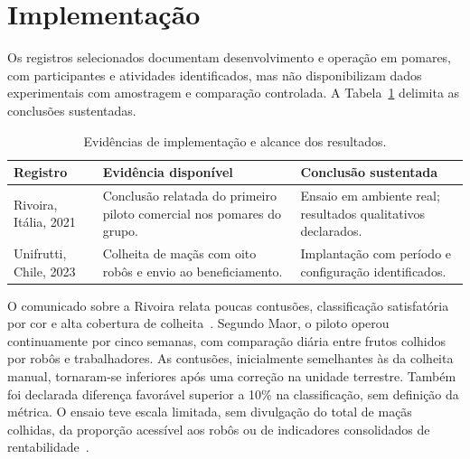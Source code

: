 \section{Implementação}

Os registros selecionados documentam desenvolvimento e operação em pomares, com participantes e atividades identificados, mas não disponibilizam dados experimentais com amostragem e comparação controlada. A Tabela~\ref{tab:evidencias_implementacao} delimita as conclusões sustentadas.

\begin{table}[!htb]
    \centering
    \caption{Evidências de implementação e alcance dos resultados.}
    \label{tab:evidencias_implementacao}
    \small
    \setlength{\tabcolsep}{5pt}
    \renewcommand{\arraystretch}{1.10}

    \begin{tabularx}{\textwidth}{@{}
        >{\raggedright\arraybackslash}p{}
        >{\raggedright\arraybackslash}p{}
        >{\raggedright\arraybackslash}X
        @{}}
        \hline
        \textbf{Registro} &
        \textbf{Evidência disponível} &
        \textbf{Conclusão sustentada} \\
        \hline

        Rivoira, Itália, 2021~\cite{tevel2021rivoira} &
        Conclusão relatada do primeiro piloto comercial nos pomares do grupo. &
        Ensaio em ambiente real; resultados qualitativos declarados. \\
        \hline

        Unifrutti, Chile, 2023~\cite{unifrutti2023tevel} &
        Colheita de maçãs com oito robôs e envio ao beneficiamento. &
        Implantação com período e configuração identificados. \\
        \hline

    \end{tabularx}
\end{table}

O comunicado sobre a Rivoira relata poucas contusões, classificação satisfatória por cor e alta cobertura de colheita~\cite{tevel2021rivoira}. Segundo Maor, o piloto operou continuamente por cinco semanas, com comparação diária entre frutos colhidos por robôs e trabalhadores. As contusões, inicialmente semelhantes às da colheita manual, tornaram-se inferiores após uma correção na unidade terrestre. Também foi declarada diferença favorável superior a 10\% na classificação, sem definição da métrica. O ensaio teve escala limitada, sem divulgação do total de maçãs colhidas, da proporção acessível aos robôs ou de indicadores consolidados de rentabilidade~\cite{ellis2022tevel}.

